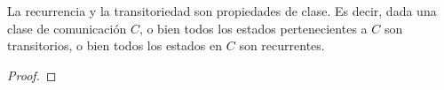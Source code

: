 \begin{teo}
    La recurrencia y la transitoriedad son propiedades de clase. Es decir, dada una clase de comunicación $C$, o bien todos los estados pertenecientes a $C$ son transitorios, o bien todos los estados en $C$ son recurrentes. \\


\begin{proof}





\end{proof}
\end{teo}

